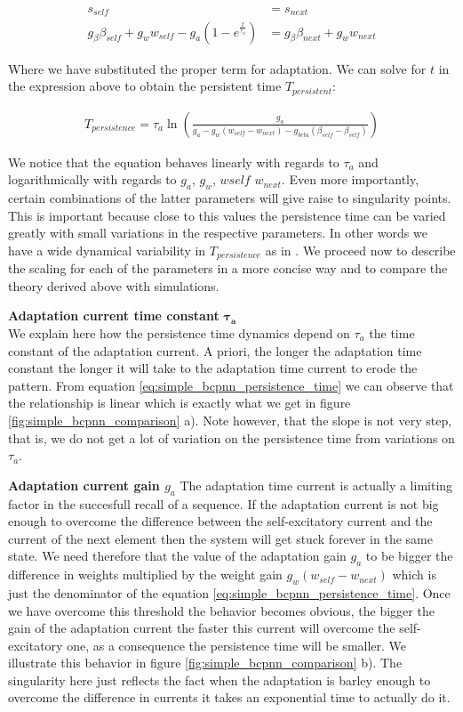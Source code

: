 \documentclass[10pt,a4paper]{article}
\begin{document}
\begin{align*}
s_{self} &= s_{next} \\
g_{\beta} \beta_{self} + g_w w_{self} - g_{a} (1 - e^{\frac{t}{\tau_a}}) &= g_{\beta} \beta_{next} + g_w w_{next}
\end{align*}

Where we have substituted the proper term for adaptation. We can solve for $t$ in the expression above to obtain the persistent time $T_{persistent}$:

\begin{align}
T_{persistence} = \tau_{a} \ln \left(\frac{g_a}{g_a - g_w (w_{self}  - w_{next}) - g_{beta} (\beta_{self} - \beta_{self})} \right) \label{eq:simple_bcpnn_persistence_time}
\end{align}

We notice that the equation behaves linearly with regards to $\tau_a$ and logarithmically with regards to $g_a$, $g_w$, $w{self}$ $w_{next}$. Even more importantly, certain combinations of the latter parameters will give raise to singularity points. This is important because close to this values the persistence time can be varied greatly with small variations in the respective parameters. In other words we have a wide dynamical variability in $T_{persistence}$ as in \cite{murray2017learning}. We proceed now to describe the scaling for each of the parameters in a more concise way and to compare the theory derived above with simulations. 

\textbf{Adaptation current time constant} $\mathbf{\tau_{a}}$ \\
We explain here how the persistence time dynamics depend on $\tau_a$ the time constant of the adaptation current. A priori, the longer the adaptation time constant the longer it will take to the adaptation time current to erode the pattern. From equation \ref{eq:simple_bcpnn_persistence_time} we can observe that the relationship is linear which is exactly what we get in figure \ref{fig:simple_bcpnn_comparison} a).  Note however, that the slope is not very step, that is, we do not get a lot of variation on the persistence time from variations on $\tau_a$. 

\textbf{Adaptation current gain $g_a$}
The adaptation time current is actually a limiting factor in the succesfull recall of a sequence. If the adaptation current is not big enough to overcome the difference between the self-excitatory current and the current of the next element then the system will get stuck forever in the same state.  We need therefore that the value of the adaptation gain $g_a$ to be bigger the difference in weights multiplied by the weight gain $ g_w (w_{self}  - w_{next})$ which is just the denominator of the equation \ref{eq:simple_bcpnn_persistence_time}. Once we have overcome this threshold the behavior becomes obvious, the bigger the gain of the adaptation current the faster this current will overcome the self-excitatory one, as a consequence the persistence time will be smaller. We illustrate this behavior in figure \ref{fig:simple_bcpnn_comparison} b). The singularity here just reflects the fact when the adaptation is barley enough to overcome the difference in currents it takes an exponential time to actually do it. 
\end{document}
